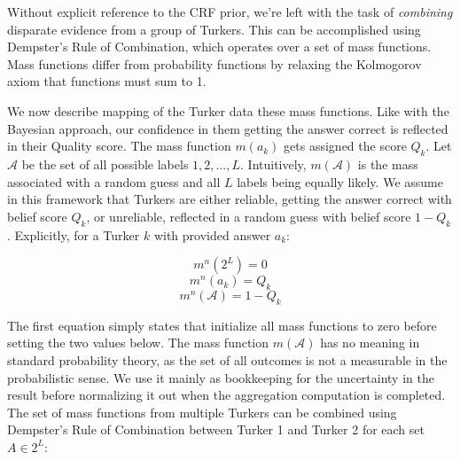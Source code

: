 Without explicit reference to the CRF prior, we're left with the task of \textit{combining} disparate evidence from a group of Turkers.  This can be accomplished using Dempster's Rule of Combination, which operates over a set of mass functions.  Mass functions differ from probability functions by relaxing the Kolmogorov axiom that functions must sum to 1.



We now describe mapping of the Turker data these mass functions.  Like with the Bayesian approach, our confidence in them getting the answer correct is reflected in their Quality score.  The mass function $m(a_{k})$ gets assigned the score $Q_{k}$.  Let $\mathcal{A}$ be the set of all possible labels ${1,2,...,L}$.  Intuitively, $m(\mathcal{A})$ is the mass associated with a random guess and all $L$ labels being equally likely.  We assume in this framework that Turkers are either reliable, getting the answer correct with belief score $Q_{k}$, or unreliable, reflected in a random guess with belief score $1-Q_{k}$.  Explicitly, for a Turker $k$ with provided answer $a_{k}$:

\begin{equation}
m^{n}(2^{L}) = 0
\end{equation}
\begin{equation}
\label{eq:mass1}
m^{n}(a_{k}) = Q_{k}
\end{equation}
\begin{equation}
\label{eq:mass2}
m^{n}(\mathcal{A}) = 1-Q_{k}
\end{equation}

The first equation simply states that initialize all mass functions to zero before setting the two values below.  The mass function $m(\mathcal{A})$ has no meaning in standard probability theory, as the set of all outcomes is not a measurable in the probabilistic sense.  We use it mainly as bookkeeping for the uncertainty in the result before normalizing it out when the aggregation computation is completed.  The set of mass functions from multiple Turkers can be combined using Dempster's Rule of Combination between Turker 1 and Turker 2 for each set $A\in2^{L}$:


